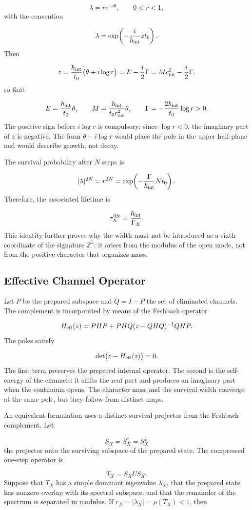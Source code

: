 \[
\lambda=r e^{-i\theta},
\qquad 0<r<1,
\]
with the convention

\[
\lambda=\exp\!\left(-\frac{i}{\hbar_{\rm int}}z t_0\right).
\]
Then

\[
z=\frac{\hbar_{\rm int}}{t_0}
\bigl(\theta+i\log r\bigr)
=E-\frac{i}{2}\Gamma
=Mc_{\rm int}^{2}-\frac{i}{2}\Gamma,
\]
so that

\[
E=\frac{\hbar_{\rm int}}{t_0}\theta,
\qquad
M=\frac{\hbar_{\rm int}}{t_0c_{\rm int}^{2}}\theta,
\qquad
\Gamma=-\frac{2\hbar_{\rm int}}{t_0}\log r>0.
\]
The positive sign before \(i\log r\) is compulsory: since \(\log r<0\), the imaginary part of \(z\) is negative. The form \(\theta-i\log r\) would place the pole in the upper half-plane and would describe growth, not decay.

The survival probability after \(N\) steps is

\[
|\lambda|^{2N}=r^{2N}
=\exp\!\left(-\frac{\Gamma}{\hbar_{\rm int}}Nt_0\right).
\]
Therefore, the associated lifetime is

\[
\tau_X^{\rm life}=\frac{\hbar_{\rm int}}{\Gamma_X}.
\]
This identity further proves why the width must not be introduced as a sixth coordinate of the signature \(\mathbb Z^5\): it arises from the modulus of the open mode, not from the positive character that organizes mass.

\subsection{Effective Channel Operator}
Let \(P\) be the prepared subspace and \(Q=I-P\) the set of eliminated channels. The complement is incorporated by means of the Feshbach operator

\[
H_{\rm eff}(z)
=PHP+PHQ(z-QHQ)^{-1}QHP.
\]
The poles satisfy

\[
\det\bigl(z-H_{\rm eff}(z)\bigr)=0.
\]
The first term preserves the prepared internal operator. The second is the self-energy of the channels: it shifts the real part and produces an imaginary part when the continuum opens. The character mass and the survival width converge at the same pole, but they follow from distinct maps.

An equivalent formulation uses a distinct survival projector from the Feshbach complement. Let

\[
S_X=S_X^*=S_X^2
\]
the projector onto the surviving subspace of the prepared state. The compressed one-step operator is

\[
T_X=S_XUS_X.
\]
Suppose that \(T_X\) has a simple dominant eigenvalue \(\lambda_X\),
that the prepared state has nonzero overlap with its spectral subspace, and
that the remainder of the spectrum is separated in modulus. If
\(r_X=|\lambda_X|=\rho(T_X)<1\), then

